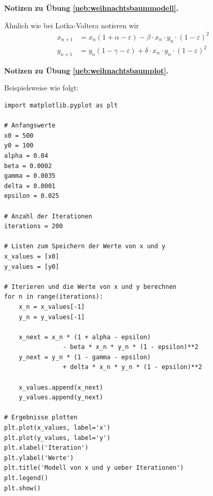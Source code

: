 \documentclass[%
11pt,%
twoside,%
titlepage,%
german,%
headsepline%
]{scrartcl}
\newcommand{\concatueb}[1]{ueb:#1}%
\newcommand{\concatlsg}[1]{lsg:#1}%
\newenvironment{lsg}[1]{%
    \par\noindent\textbf{Notizen zu Übung \ref{\concatueb{#1}}.}%
    \label{\concatlsg{#1}}
}{%
    \par%
}
\begin{document}
\begin{lsg}{weihnachtsbaummodell}
Ähnlich wie bei Lotka-Voltera notieren wir
\begin{align*}
x_{n+1}&=x_n(1+\alpha-\varepsilon)-\beta\cdot x_n\cdot y_n\cdot(1-\varepsilon)^2\\
y_{n+1}&=y_n(1-\gamma-\varepsilon)+\delta\cdot x_n\cdot y_n\cdot(1-\varepsilon)^2
\end{align*}
\end{lsg}
\begin{lsg}{weihnachtsbaumplot}
Beispielsweise wie folgt:

\begin{lstlisting}
import matplotlib.pyplot as plt

# Anfangswerte
x0 = 500
y0 = 100
alpha = 0.04
beta = 0.0002
gamma = 0.0035
delta = 0.0001
epsilon = 0.025

# Anzahl der Iterationen
iterations = 200

# Listen zum Speichern der Werte von x und y
x_values = [x0]
y_values = [y0]

# Iterieren und die Werte von x und y berechnen
for n in range(iterations):
    x_n = x_values[-1]
    y_n = y_values[-1]
    
    x_next = x_n * (1 + alpha - epsilon) 
    			- beta * x_n * y_n * (1 - epsilon)**2
    y_next = y_n * (1 - gamma - epsilon) 
    			+ delta * x_n * y_n * (1 - epsilon)**2
    
    x_values.append(x_next)
    y_values.append(y_next)

# Ergebnisse plotten
plt.plot(x_values, label='x')
plt.plot(y_values, label='y')
plt.xlabel('Iteration')
plt.ylabel('Werte')
plt.title('Modell von x und y ueber Iterationen')
plt.legend()
plt.show()
\end{lstlisting}
\end{lsg}

\clearpage




\end{document}

